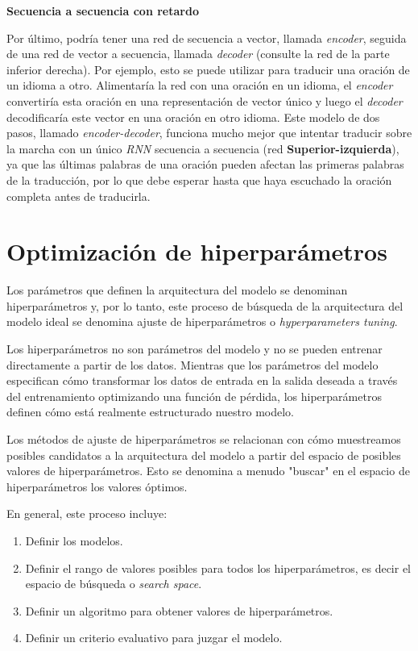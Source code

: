 \documentclass[a4paper,12pt]{article}
\begin{document}
\textbf{Secuencia a secuencia con retardo}

Por último, podría tener una red de secuencia a vector, llamada \textit{encoder}, seguida de una red de vector a secuencia, llamada \textit{decoder} (consulte la red de la parte inferior derecha). Por ejemplo, esto se puede utilizar para traducir una oración de un idioma a otro. Alimentaría la red con una oración en un idioma, el \textit{encoder} convertiría esta oración en una representación de vector único y luego el \textit{decoder} decodificaría este vector en una oración en otro idioma. Este modelo de dos pasos, llamado \textit{encoder-decoder}, funciona mucho mejor que intentar traducir sobre la marcha con un único \textit{RNN} secuencia a secuencia (red \textbf{Superior-izquierda}), ya que las últimas palabras de una oración pueden afectan las primeras palabras de la traducción, por lo que debe esperar hasta que haya escuchado la oración completa antes de traducirla.

\clearpage

\section{Optimización de hiperparámetros} \label{tuning-hp}
Los parámetros que definen la arquitectura del modelo se denominan hiperparámetros y, por lo tanto, este proceso de búsqueda de la arquitectura del modelo ideal se denomina ajuste de hiperparámetros o \textit{hyperparameters tuning}. \citep{Koehrsen2018Jul}

Los hiperparámetros no son parámetros del modelo y no se pueden entrenar directamente a partir de los datos. Mientras que los parámetros del modelo especifican cómo transformar los datos de entrada en la salida deseada a través del entrenamiento optimizando una función de pérdida, los hiperparámetros definen cómo está realmente estructurado nuestro modelo.

Los métodos de ajuste de hiperparámetros se relacionan con cómo muestreamos posibles candidatos a la arquitectura del modelo a partir del espacio de posibles valores de hiperparámetros. Esto se denomina a menudo "buscar" en el espacio de hiperparámetros los valores óptimos.

En general, este proceso incluye:

\begin{enumerate}[noitemsep, topsep=2pt]
	\item Definir los modelos.
	\item Definir el rango de valores posibles para todos los hiperparámetros, es decir el espacio de búsqueda o \textit{search space}.
	\item Definir un algoritmo para obtener valores de hiperparámetros.
	\item Definir un criterio evaluativo para juzgar el modelo.
\end{enumerate}
\end{document}
